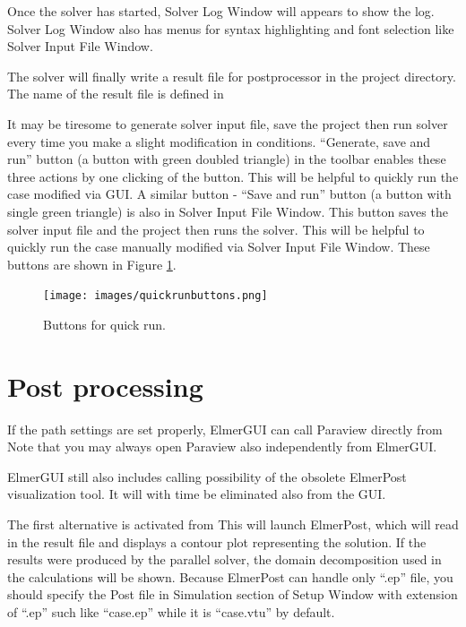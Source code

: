Once the solver has started, Solver Log Window will appears to show the log. Solver Log Window also has menus for syntax highlighting and font selection like Solver Input File Window. 

The solver will finally write a result file for postprocessor in the project directory.
The name of the result file is defined in

It may be tiresome to generate solver input file, save the project then run solver every time you make a slight modification in conditions. ``Generate, save and run'' button (a button with green doubled triangle) in the toolbar enables these three actions by one clicking of the button. This will be helpful to quickly run the case modified via GUI.
A similar button - ``Save and run'' button (a button with single green triangle) is also in Solver Input File Window. This button saves the solver input file and the project then runs the solver. This will be helpful to quickly run the case manually modified via Solver Input File Window. 
These buttons are shown in Figure \ref{fig:quickbuttons}.

\begin{figure}[htb]
	\begin{center}
		\texttt{[image: images/quickrunbuttons.png]}
		\caption{Buttons for quick run.}
		\label{fig:quickbuttons}
	\end{center}
\end{figure}
\section{Post processing}

If the path settings are set properly, ElmerGUI can call Paraview directly from
Note that you may always open Paraview also independently from ElmerGUI. 

ElmerGUI still also includes calling possibility of the obsolete ElmerPost visualization tool.
It will with time be eliminated also from the GUI. 



The first alternative is activated from
\noindent This will launch ElmerPost, which will read in the result file and displays a contour plot representing the solution. If the results were produced by the parallel solver, the domain decomposition used in the calculations will be shown. Because ElmerPost can handle only ``.ep'' file, you should specify the Post file in Simulation section of Setup Window with extension of ``.ep'' such like ``case.ep'' while it is ``case.vtu'' by default.

